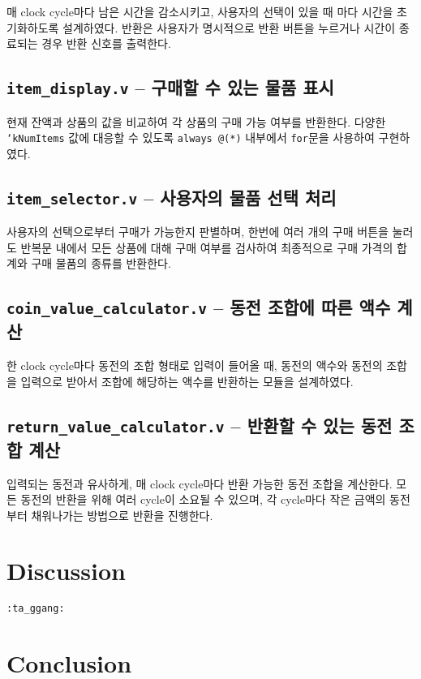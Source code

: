 \documentclass{scrartcl}
\begin{document}
매 clock cycle마다 남은 시간을 감소시키고, 사용자의 선택이 있을 때 마다 시간을 초기화하도록 설계하였다.
반환은 사용자가 명시적으로 반환 버튼을 누르거나 시간이 종료되는 경우 반환 신호를 출력한다.

\subsection{\texttt{item\_display.v} -- 구매할 수 있는 물품 표시}

현재 잔액과 상품의 값을 비교하여 각 상품의 구매 가능 여부를 반환한다. 다양한 \texttt{`kNumItems} 값에 대응할 수 있도록
\texttt{always @(*)} 내부에서 \texttt{for}문을 사용하여 구현하였다.

\subsection{\texttt{item\_selector.v} -- 사용자의 물품 선택 처리}

사용자의 선택으로부터 구매가 가능한지 판별하며, 한번에 여러 개의 구매 버튼을 눌러도 반복문 내에서
모든 상품에 대해 구매 여부를 검사하여 최종적으로 구매 가격의 합계와 구매 물품의 종류를 반환한다.

\subsection{\texttt{coin\_value\_calculator.v} -- 동전 조합에 따른 액수 계산}

한 clock cycle마다 동전의 조합 형태로 입력이 들어올 때, 동전의 액수와 동전의 조합을 입력으로 받아서
조합에 해당하는 액수를 반환하는 모듈을 설계하였다.

\subsection{\texttt{return\_value\_calculator.v} -- 반환할 수 있는 동전 조합 계산}

입력되는 동전과 유사하게, 매 clock cycle마다 반환 가능한 동전 조합을 계산한다.
모든 동전의 반환을 위해 여러 cycle이 소요될 수 있으며, 각 cycle마다 작은 금액의 동전부터 채워나가는 방법으로
반환을 진행한다.

\section{Discussion}
\texttt{:ta\_ggang:} %

\section{Conclusion}
\end{document}
